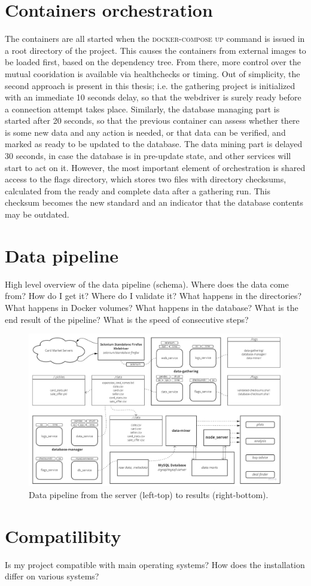 \section{Containers orchestration}
The containers are all started when the \textsc{docker-compose up} command is issued in a root directory of the project. This causes the containers from external images to be loaded first, based on the dependency tree. From there, more control over the mutual cooridation is available via healthchecks or timing. Out of simplicity, the second approach is present in this thesis; i.e. the gathering project is initialized with an immediate 10 seconds delay, so that the webdriver is surely ready before a connection attempt takes place. Similarly, the database managing part is started after 20 seconds, so that the previous container can assess whether there is some new data and any action is needed, or that data can be verified, and marked as ready to be updated to the database. The data mining part is delayed 30 seconds, in case the database is in pre-update state, and other services will start to act on it. However, the most important element of orchestration is shared access to the flags directory, which stores two files with directory checksums, calculated from the ready and complete data after a gathering run. This checksum becomes the new standard and an indicator that the database contents may be outdated.

\section{Data pipeline}
High level overview of the data pipeline (schema).
Where does the data come from? How do I get it?
Where do I validate it? What happens in the directories?
What happens in Docker volumes? What happens in the database?
What is the end result of the pipeline?
What is the speed of consecutive steps?

\begin{figure}[h!]
\centering
\includegraphics[width=\textwidth]{figures/warehousing.jpg}
\caption{Data pipeline from the server (left-top) to results (right-bottom).}
\end{figure}


\section{Compatilibity}
Is my project compatible with main operating systems?
How does the installation differ on various systems?

